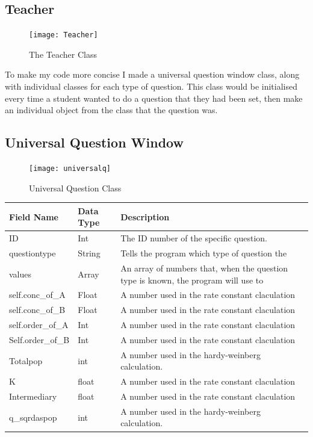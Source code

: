 \documentclass[a4paper,12pt]{report}
\begin{document}
\subsection{Teacher}
\begin{figure}
\centering
\texttt{[image: Teacher]}
\caption{The Teacher Class}
\label{fig:teacherclass}
\end{figure}

To make my code more concise I made a universal question window class, along with individual classes for each type of question. This class would be initialised every time a student wanted to do a question that they had been set, then make an individual object from the class that the question was.\\
\subsection{Universal Question Window}
\begin{figure}
\centering
\texttt{[image: universalq]}
\caption{Universal Question Class}
\label{fig:uniq}
\end{figure}
\FloatBarrier
\begin{center}
\tablefirsthead{}
\tablehead{}
\tabletail{}
\tablelasttail{}
\begin{supertabular}{|m{1.8in}|m{1.22956in}|m{2.42956in}|}
\hline
Field Name &
Data Type &
Description\\\hline
ID &
Int &
The ID number of the specific question.\\\hline
questiontype &
String &
Tells the program which type of question the \\\hline
values &
Array &
An array of numbers that, when the question type is known, the program will use to \\\hline
self.conc\_of\_A &
Float &
A number used in the rate constant claculation\\\hline
self.conc\_of\_B &
Float &
A number used in the rate constant claculation\\\hline
self.order\_of\_A &
Int &
A number used in the rate constant claculation\\\hline
Self.order\_of\_B &
Int  &
A number used in the rate constant claculation\\\hline
Totalpop &
int &
A number used in the hardy-weinberg calculation.\\\hline
K &
float &
A number used in the rate constant claculation\\\hline
Intermediary &
float &
A number used in the rate constant claculation\\\hline
q\_sqrdaspop &
int &
A number used in the hardy-weinberg calculation.\\\hline
\end{supertabular}
\end{center}
\end{document}
